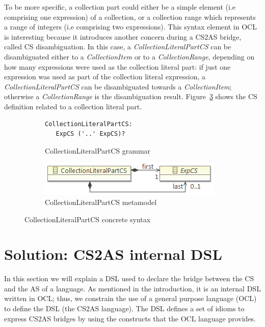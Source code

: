 \documentclass{llncs}
\begin{document}
To be more specific, a collection part could either be a simple element (i.e comprising one expression) of a collection, or a collection range which represents a range of integers (i.e comprising two expressions). This syntax element in OCL is interesting because it introduces another concern during a CS2AS bridge, called CS disambiguation. In this case, a \emph{CollectionLiteralPartCS} can be disambiguated either to a \emph{CollectionItem} or to a \emph{CollectionRange}, depending on how many expressions were used as the collection literal part: if just one expression was used as part of the collection literal expression, a \emph{CollectionLiteralPartCS} can be disambiguated towards a \emph{CollectionItem}; otherwise a \emph{CollectionRange} is the disambiguation result. Figure~\ref{fig:CollectionLiteralPartCS} shows the CS definition related to a collection literal part. 

\begin{figure}[htbp]
\centering
\begin{subfigure}{0.5\textwidth}
  \centering
\begin{lstlisting}[language=Xtext]
CollectionLiteralPartCS:
   ExpCS ('..' ExpCS)?
\end{lstlisting} 
  \caption{CollectionLiteralPartCS grammar }
  \label{fig:CollectionLiteralPartCS:a}
\end{subfigure}%
\begin{subfigure}{0.5\textwidth}
  \centering
  \includegraphics[scale=0.75]{images/CollectionLiteralPartCS.png}
  \caption{CollectionLiteralPartCS metamodel }
  \label{fig:CollectionLiteralPartCS:b}
\end{subfigure}
\caption{CollectionLiteralPartCS concrete syntax}
\label{fig:CollectionLiteralPartCS}
\end{figure}

\section{Solution: CS2AS internal DSL}
\label{sec:solution}

In this section we will explain a DSL used to declare the bridge between the CS and the AS of a language. As mentioned in the introduction, it is an internal DSL \cite{fowler2010dsl} written in OCL; thus, we constrain the use of a general purpose language (OCL) to define the DSL (the CS2AS language). The DSL defines a set of idioms to express CS2AS bridges by using the constructs that the OCL language provides.
\end{document}
